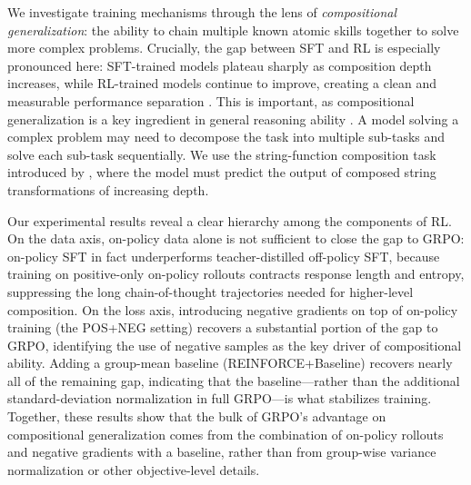 \documentclass[12pt]{cmuthesis}
\begin{document}

We investigate training mechanisms through the lens of \emph{compositional generalization}: the ability to chain multiple known atomic skills together to solve more complex problems. Crucially, the gap between SFT and RL is especially pronounced here: SFT-trained models plateau sharply as composition depth increases, while RL-trained models continue to improve, creating a clean and measurable performance separation \citep{yuanLLMsLearnNewSkills2025, cheng_atomic_2025}.
This is important, as compositional generalization is a key ingredient in general reasoning ability \citep{yueDoesReinforcementLearning2025, park_how_2025}. A model solving a complex problem may need to decompose the task into multiple sub-tasks and solve each sub-task sequentially. 
We use the string-function composition task introduced by \citet{yuanLLMsLearnNewSkills2025}, where the model must predict the output of composed string transformations of increasing depth.

Our experimental results reveal a clear hierarchy among the components of RL. On the data axis, on-policy data alone is not sufficient to close the gap to GRPO: on-policy SFT in fact underperforms teacher-distilled off-policy SFT, because training on positive-only on-policy rollouts contracts response length and entropy, suppressing the long chain-of-thought trajectories needed for higher-level composition. On the loss axis, introducing negative gradients on top of on-policy training (the POS+NEG setting) recovers a substantial portion of the gap to GRPO, identifying the use of negative samples as the key driver of compositional ability. Adding a group-mean baseline (REINFORCE+Baseline) recovers nearly all of the remaining gap, indicating that the baseline---rather than the additional standard-deviation normalization in full GRPO---is what stabilizes training. Together, these results show that the bulk of GRPO's advantage on compositional generalization comes from the combination of on-policy rollouts and negative gradients with a baseline, rather than from group-wise variance normalization or other objective-level details.
\end{document}
